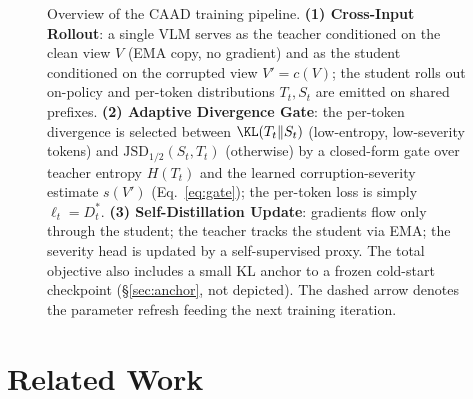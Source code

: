 \documentclass{article}
\newcommand{\JSD}{\mathrm{JSD}}
\newcommand{\teacher}{\pi_T}
\newcommand{\student}{\pi_\theta}
\newcommand{\caad}{\textsc{CAAD}}
\begin{document}
\begin{figure}[t]
{
}%
\caption{Overview of the \caad{} training pipeline. \textbf{(1) Cross-Input Rollout}: a single VLM serves as the teacher conditioned on the clean view $V$ (EMA copy, no gradient) and as the student conditioned on the corrupted view $V' = c(V)$; the student rolls out on-policy and per-token distributions $T_t, S_t$ are emitted on shared prefixes. \textbf{(2) Adaptive Divergence Gate}: the per-token divergence is selected between $\KL(T_t\|S_t)$ (low-entropy, low-severity tokens) and $\JSD_{1/2}(S_t, T_t)$ (otherwise) by a closed-form gate over teacher entropy $H(T_t)$ and the learned corruption-severity estimate $s(V')$ (Eq.~\ref{eq:gate}); the per-token loss is simply $\ell_t = D^*_t$. \textbf{(3) Self-Distillation Update}: gradients flow only through the student; the teacher tracks the student via EMA; the severity head is updated by a self-supervised proxy. The total objective also includes a small KL anchor to a frozen cold-start checkpoint (\S\ref{sec:anchor}, not depicted). The dashed arrow denotes the parameter refresh feeding the next training iteration.}
\label{fig:caad}
\end{figure}

\section{Related Work}
\end{document}
